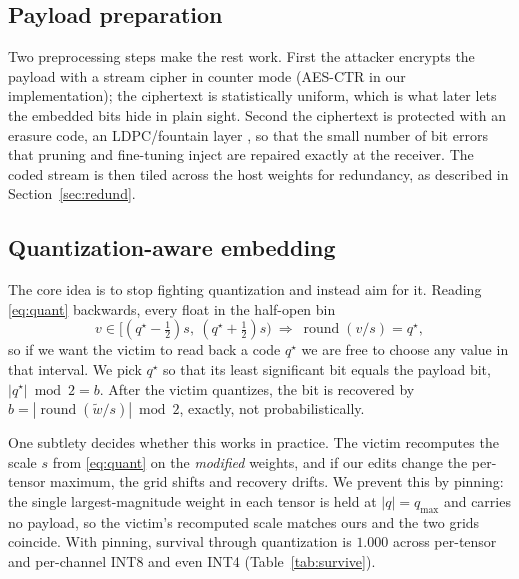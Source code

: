 \documentclass[10pt,journal]{IEEEtran}
\theoremstyle{remark}
\begin{document}
\subsection{Payload preparation}
Two preprocessing steps make the rest work. First the attacker encrypts the payload
with a stream cipher in counter mode (AES-CTR in our implementation); the ciphertext is
statistically uniform, which is what later lets the embedded bits hide in plain sight.
Second the ciphertext is protected with an erasure code, an LDPC/fountain layer
\cite{luby2002lt}, so that the small number of bit errors that pruning and fine-tuning
inject are repaired exactly at the receiver. The coded stream is then tiled across the
host weights for redundancy, as described in Section~\ref{sec:redund}.

\subsection{Quantization-aware embedding}
The core idea is to stop fighting quantization and instead aim for it. Reading
\eqref{eq:quant} backwards, every float in the half-open bin
\begin{equation}\label{eq:bin}
v\in\big[(q^\star-\tfrac12)s,\ (q^\star+\tfrac12)s\big)
\ \Longrightarrow\ \operatorname{round}(v/s)=q^\star,
\end{equation}
so if we want the victim to read back a code $q^\star$ we are free to choose any value
in that interval. We pick $q^\star$ so that its least significant bit equals the
payload bit, $|q^\star|\bmod 2 = b$. After the victim quantizes, the bit is recovered
by $\hat b=|\!\operatorname{round}(\tilde w/s)|\bmod 2$, exactly, not probabilistically.

One subtlety decides whether this works in practice. The victim recomputes the scale
$s$ from \eqref{eq:quant} on the \emph{modified} weights, and if our edits change the
per-tensor maximum, the grid shifts and recovery drifts. We prevent this by pinning:
the single largest-magnitude weight in each tensor is held at $|q|{=}q_{\max}$ and
carries no payload, so the victim's recomputed scale matches ours and the two grids
coincide. With pinning, survival through quantization is $1.000$ across per-tensor and
per-channel INT8 and even INT4 (Table~\ref{tab:survive}).
\end{document}
